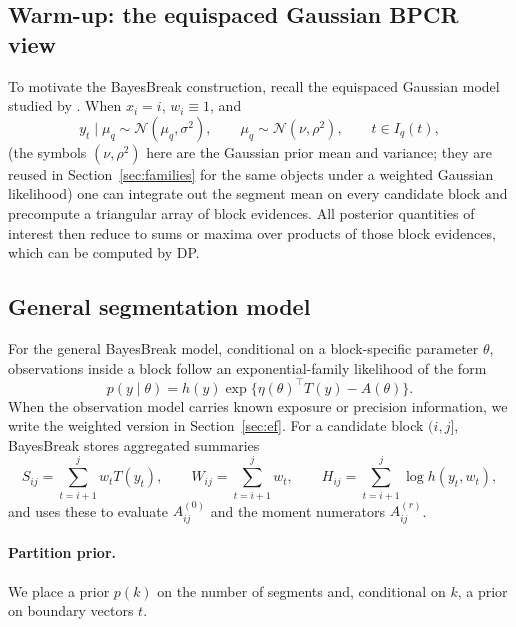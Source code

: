\subsection{Warm-up: the equispaced Gaussian BPCR view}
To motivate the BayesBreak construction, recall the equispaced Gaussian model studied by
\citet{hutter2006bpcr}. When $x_i=i$, $w_i\equiv 1$, and
\[
y_t\mid \mu_q \sim \mathcal{N}(\mu_q,\sigma^2),
\qquad
\mu_q\sim \mathcal{N}(\nu,\rho^2),
\qquad t\in I_q(t),
\]
(the symbols $(\nu,\rho^2)$ here are the Gaussian prior mean and variance; they are reused in
Section~\ref{sec:families} for the same objects under a weighted Gaussian likelihood)
one can integrate out the segment mean on every candidate block and precompute a triangular array
of block evidences. All posterior quantities of interest then reduce to sums or maxima over
products of those block evidences, which can be computed by DP.

\subsection{General segmentation model}
\label{subsec:general-setup}

For the general BayesBreak model, conditional on a block-specific parameter $\theta$, observations
inside a block follow an exponential-family likelihood of the form
\begin{equation}
p(y\mid \theta)=h(y)\exp\{\eta(\theta)^\top T(y)-A(\theta)\}.
\label{eq:EFbasic}
\end{equation}
When the observation model carries known exposure or precision information, we write the weighted
version in Section~\ref{sec:ef}. For a candidate block $(i,j]$, BayesBreak stores aggregated
summaries
\[
S_{ij}=\sum_{t=i+1}^j w_t T(y_t),
\qquad
W_{ij}=\sum_{t=i+1}^j w_t,
\qquad
H_{ij}=\sum_{t=i+1}^j \log h(y_t,w_t),
\]
and uses these to evaluate $A^{(0)}_{ij}$ and the moment numerators $A^{(r)}_{ij}$.

\paragraph{Partition prior.}
We place a prior $p(k)$ on the number of segments and, conditional on $k$, a prior on boundary
vectors $t$.

